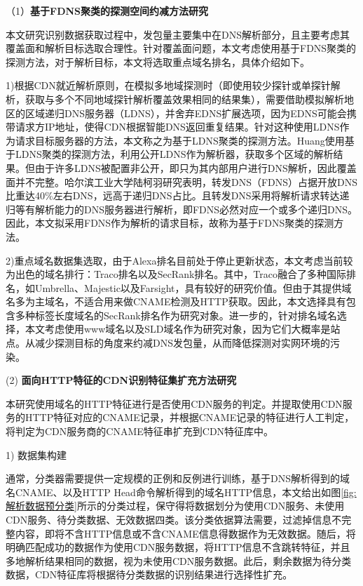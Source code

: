 （1）\textbf{基于FDNS聚类的探测空间约减方法研究}  

本文研究识别数据获取过程中，发包量主要集中在DNS解析部分，且主要考虑其覆盖面和解析目标选取合理性。针对覆盖面问题，本文考虑使用基于FDNS聚类的探测方法，对于解析目标，本文将选取重点域名排名，具体介绍如下。

1)根据CDN就近解析原则，在模拟多地域探测时（即使用较少探针或单探针解析，获取与多个不同地域探针解析覆盖效果相同的结果集），需要借助模拟解析地区的区域递归DNS服务器（LDNS），并舍弃EDNS扩展选项，因为EDNS可能会携带请求方IP地址，使得CDN根据智能DNS返回重复结果。针对这种使用LDNS作为请求目标服务器的方法，本文称之为基于LDNS聚类的探测方法。Huang\cite{Huang2008}使用基于LDNS聚类的探测方法，利用公开LDNS作为解析器，获取多个区域的解析结果。但由于许多LDNS被配置非公开，即只为其内部用户进行DNS解析，因此覆盖面并不完整\cite{吴金福2014中国大陆}。哈尔滨工业大学陆柯羽研究表明，转发DNS（FDNS）占据开放DNS比重达40\%左右DNS\cite{lukeyu-2021-DNS}，远高于递归DNS占比。且转发DNS采用将解析请求转达递归等有解析能力的DNS服务器进行解析，即FDNS必然对应一个或多个递归DNS。因此，本文拟采用FDNS作为解析的请求目标，故称为基于FDNS聚类的探测方法。
 

2)重点域名数据集选取，由于Alexa排名目前处于停止更新状态，本文考虑当前较为出色的域名排行：Traco\cite{Pochat2018}排名以及SecRank\cite{Xie2022}排名。其中，Traco融合了多种国际排名，如Umbrella、Majestic以及Farsight，具有较好的研究价值。但由于其提供域名多为主域名，不适合用来做CNAME检测及HTTP获取。因此，本文选择具有包含多种标签长度域名的SecRank排名作为研究对象。进一步的，针对排名域名选择，本文考虑使用www域名以及SLD域名作为研究对象，因为它们大概率是站点。从减少探测目标的角度来约减DNS发包量，从而降低探测对实网环境的污染。 


(2) \textbf{面向HTTP特征的CDN识别特征集扩充方法研究}

本研究使用域名的HTTP特征进行是否使用CDN服务的判定。并提取使用CDN服务的HTTP特征对应的CNAME记录，并根据CNAME记录的特征进行人工判定，将判定为CDN服务商的CNAME特征串扩充到CDN特征库中。

1) 数据集构建

通常，分类器需要提供一定规模的正例和反例进行训练，基于DNS解析得到的域名CNAME、以及HTTP Head命令解析得到的域名HTTP信息，本文给出如图\ref{fig:解析数据预分类}所示的分类过程，保守得将数据划分为使用CDN服务、未使用CDN服务、待分类数据、无效数据四类。该分类依据算法需要，过滤掉信息不完整内容，即将不含HTTP信息或不含CNAME信息得数据作为无效数据。随后，将明确匹配成功的数据作为使用CDN服务数据，将HTTP信息不含跳转特征，并且多地解析结果相同的数据，视为未使用CDN服务数据。此后，剩余数据为待分类数据，CDN特征库将根据待分类数据的识别结果进行选择性扩充。
 
